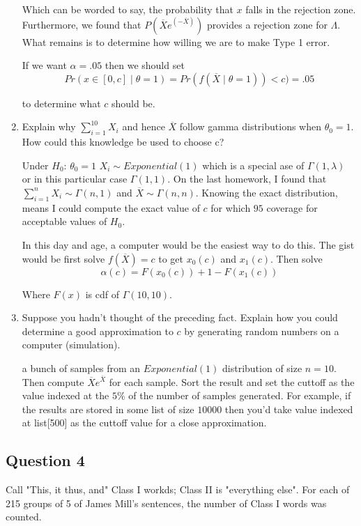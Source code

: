 \documentclass{tufte-book}
\theoremstyle{mytheoremstyle}
\theoremstyle{mylemstyle}
\theoremstyle{mydefstyle}
\begin{document}
\begin{enumerate}
Which can be worded to say, the probability that $x$ falls in the rejection zone.  Furthermore, we found that $P(\overline{X} e^{(-\overline{X})})$ provides a rejection zone for $\Lambda$.  What remains is to determine how willing we are to make Type 1 error.

If we want $\alpha=.05$ then we should set
\[ Pr(x \in [0, c] \mid \theta=1) = Pr(f(\overline{X} \mid \theta=1)) < c) = .05 \]

to determine what $c$ should be.

\item Explain why $\sum_{i=1}^{10} X_i$ and hence $\overline{X}$ follow gamma distributions when $\theta_0=1$.  How could this knowledge be used to choose c?

Under $H_0$: $\theta_0=1$ $X_i \sim Exponential(1)$ which is a special ase of $\Gamma(1,\lambda)$ or in this particular case $\Gamma(1,1)$.  On the last homework, I found that $\sum_{i=1}^n X_i \sim \Gamma(n,1)$ and $\overline{X} \sim \Gamma(n,n)$.  Knowing the exact distribution, means I could compute the exact value of $c$ for which $95$ coverage for acceptable values of $H_0$.

In this day and age, a computer would be the easiest way to do this.  The gist would be first solve $f(\overline{X})=c$ to get $x_0(c)$ and $x_1(c)$.  Then solve
\[ \alpha(c) = F(x_0(c)) + 1-F(x_1(c)) \]

Where $F(x)$ is cdf of $\Gamma(10,10)$.

\item Suppose you hadn't thought of the preceding fact.  Explain how you could determine a good approximation to $c$ by generating random numbers on a computer (simulation).

 a bunch of samples from an $Exponential(1)$ distribution of size $n=10$.  Then compute $\overline{X}e^{\overline{X}}$ for each sample. Sort the result and set the cuttoff as the value indexed at the $5\%$ of the number of samples generated.  For example, if the results are stored in some list of size $10000$ then you'd take value indexed at list[500] as the cuttoff value for a close approximation.
\end{enumerate}

\subsection{Question 4}

Call "This, it thus, and" Class I workds; Class II is "everything else".   For each of 215 groups of 5 of James Mill's sentences, the number of Class I words was counted.
\end{document}
